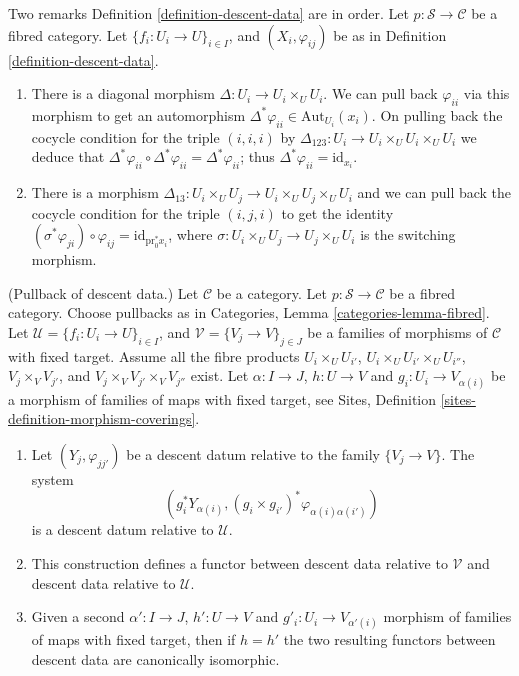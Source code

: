 \begin{remarks}
\label{remarks-definition-descent-datum}
Two remarks Definition \ref{definition-descent-data} are in order.
Let $p : \mathcal{S} \to \mathcal{C}$ be a fibred category.
Let $\{f_i : U_i \to U\}_{i \in I}$, and $(X_i, \varphi_{ij})$
be as in Definition \ref{definition-descent-data}.
\begin{enumerate}
\item There is a diagonal morphism $\Delta : U_i \to U_i \times_U U_i$.
We can pull back $\varphi_{ii}$ via this morphism to get an automorphism
$\Delta^\ast \varphi_{ii} \in \text{Aut}_{U_i}(x_i)$.
On pulling back the cocycle condition for the triple $(i, i, i)$
by $\Delta_{123} : U_i \to U_i\times_U U_i \times_U U_i$ we deduce that
$\Delta^\ast \varphi_{ii} \circ \Delta^\ast \varphi_{ii} =
\Delta^\ast \varphi_{ii}$; thus $\Delta^\ast \varphi_{ii} =
\text{id}_{x_i}$.
\item There is a morphism
$\Delta_{13}: U_i \times_U U_j \to U_i \times_U U_j \times_U U_i$
and we can pull back the
cocycle condition for the triple $(i, j, i)$ to get the
identity $(\sigma^\ast \varphi_{ji}) \circ \varphi_{ij} =
\text{id}_{\text{pr}_0^\ast x_i}$, where
$\sigma: U_i \times_U U_j \to U_j \times_U U_i$ is the switching morphism.
\end{enumerate}
\end{remarks}

\begin{lemma}
\label{lemma-pullback}
(Pullback of descent data.)
Let $\mathcal{C}$ be a category.
Let $p : \mathcal{S} \to \mathcal{C}$ be a fibred category.
Choose pullbacks as in Categories, Lemma \ref{categories-lemma-fibred}.
Let $\mathcal{U} = \{f_i : U_i \to U\}_{i \in I}$, and
$\mathcal{V} = \{V_j \to V\}_{j \in J}$ 
be a families of morphisms of $\mathcal{C}$ with fixed target.
Assume all the fibre products
$U_i \times_U U_{i'}$, $U_i \times_U U_{i'} \times_U U_{i''}$,
$V_j \times_V V_{j'}$, and $V_j \times_V V_{j'} \times_V V_{j''}$ exist.
Let $\alpha : I \to J$, $h : U \to V$ and
$g_i : U_i \to V_{\alpha(i)}$ be a morphism of families
of maps with fixed target, see
Sites, Definition \ref{sites-definition-morphism-coverings}.
\begin{enumerate}
\item Let $(Y_j, \varphi_{jj'})$ be a descent datum relative to the
family $\{V_j \to V\}$. The system
$$
\left(
g_i^*Y_{\alpha(i)},
(g_i \times g_{i'})^*\varphi_{\alpha(i)\alpha(i')}
\right)
$$
is a descent datum relative to $\mathcal{U}$.
\item This construction defines a functor between descent data relative
to $\mathcal{V}$ and descent data relative to $\mathcal{U}$.
\item Given a second $\alpha' : I \to J$, $h' : U \to V$ and
$g'_i : U_i \to V_{\alpha'(i)}$ morphism of families
of maps with fixed target, then if $h = h'$ the two resulting functors
between descent data are canonically isomorphic.
\end{enumerate}
\end{lemma}

